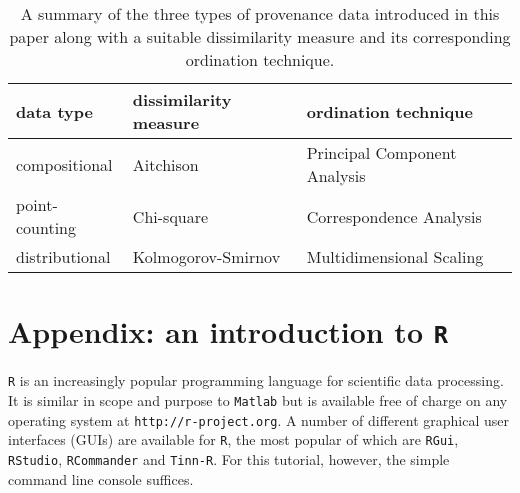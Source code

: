 \documentclass[11pt]{article}
\begin{document}
\begin{table}[!ht]
  \centering
  \captionsetup{width=.72\linewidth}
  \caption{A summary of the three types of provenance data introduced
    in this paper along with a suitable dissimilarity measure and its
    corresponding ordination technique.}
  \begin{tabular}{lll}
    data type & dissimilarity measure & ordination technique \\ \hline
    compositional & Aitchison & Principal Component Analysis \\
    point-counting & Chi-square & Correspondence Analysis  \\
    distributional & Kolmogorov-Smirnov & Multidimensional Scaling
  \end{tabular}
  \label{tab:3types}
\end{table}

\section*{Appendix: an introduction to \texttt{R}}
\label{sec:R}

\texttt{R} is an increasingly popular programming language for
scientific data processing. It is similar in scope and purpose to
\texttt{Matlab} but is available free of charge on any operating
system at \texttt{http://r-project.}\allowbreak\texttt{org}. A number
of different graphical user interfaces (GUIs) are available for
\texttt{R}, the most popular of which are \texttt{RGui},
\texttt{RStudio}, \texttt{RCommander} and \texttt{Tinn-R}.  For this
tutorial, however, the simple command line console suffices.
\end{document}
